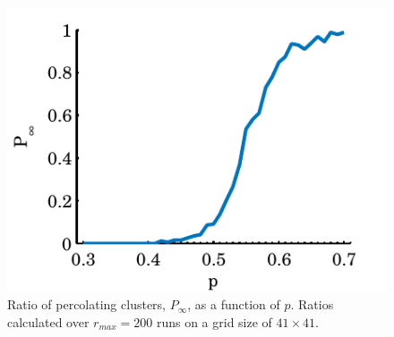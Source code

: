 \begin{figure}
	\centering
	\includegraphics[width=\columnwidth]{./img/assignment_a_p_infinite_ratio_p.pdf}
	\caption{Ratio of percolating clusters, $P_\infty$, as a function of $p$. Ratios calculated over $r_{max} = 200$ runs on a grid size of $41 \times 41$.}
	\label{fig:experiment:p_inf_ratio}
\end{figure}